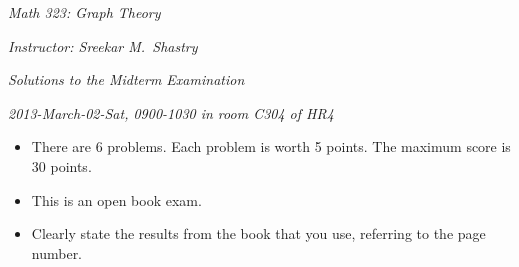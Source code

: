 \documentclass[10pt,reqno]{amsart}
\begin{document}
\noindent \textit{Math 323: Graph Theory}

\noindent \textit{Instructor: Sreekar M.~Shastry}

\noindent \textit{Solutions to the Midterm Examination}

\noindent \textit{2013-March-02-Sat, 0900-1030 in room C304 of HR4}

\medskip

\begin{itemize}
    \item There are 6 problems. Each problem is worth 5 points. The
        maximum score is 30 points.
    \item This is an open book exam.
    \item Clearly state the results from the book that you use, referring to
      the page number.
\end{itemize}

\medskip
\end{document}
